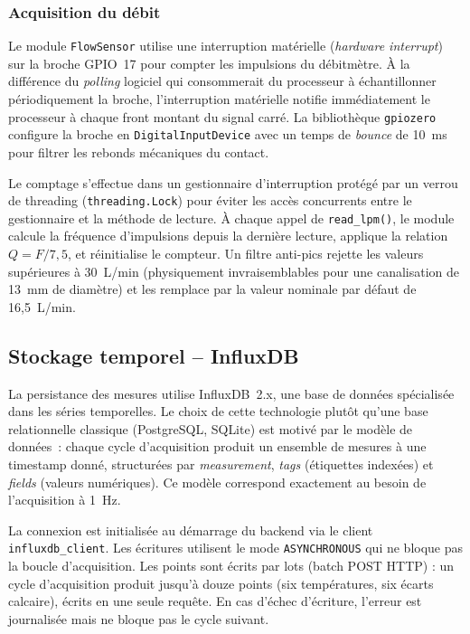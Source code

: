 \subsubsection{Acquisition du débit}

Le module \texttt{FlowSensor} utilise une interruption matérielle (\emph{hardware interrupt}) sur la broche GPIO~17 pour compter les impulsions du débitmètre. À la différence du \emph{polling} logiciel qui consommerait du processeur à échantillonner périodiquement la broche, l'interruption matérielle notifie immédiatement le processeur à chaque front montant du signal carré. La bibliothèque \texttt{gpiozero} configure la broche en \texttt{DigitalInputDevice} avec un temps de \emph{bounce} de 10~ms pour filtrer les rebonds mécaniques du contact.

Le comptage s'effectue dans un gestionnaire d'interruption protégé par un verrou de threading (\texttt{threading.Lock}) pour éviter les accès concurrents entre le gestionnaire et la méthode de lecture. À chaque appel de \texttt{read\_lpm()}, le module calcule la fréquence d'impulsions depuis la dernière lecture, applique la relation \(Q = F / 7,5\), et réinitialise le compteur. Un filtre anti-pics rejette les valeurs supérieures à 30~L/min (physiquement invraisemblables pour une canalisation de 13~mm de diamètre) et les remplace par la valeur nominale par défaut de 16,5~L/min.

\subsection{Stockage temporel -- InfluxDB}

La persistance des mesures utilise InfluxDB~2.x, une base de données spécialisée dans les séries temporelles. Le choix de cette technologie plutôt qu'une base relationnelle classique (PostgreSQL, SQLite) est motivé par le modèle de données~: chaque cycle d'acquisition produit un ensemble de mesures à une timestamp donné, structurées par \emph{measurement}, \emph{tags} (étiquettes indexées) et \emph{fields} (valeurs numériques). Ce modèle correspond exactement au besoin de l'acquisition à 1~Hz.

La connexion est initialisée au démarrage du backend via le client \texttt{influxdb\_client}. Les écritures utilisent le mode \texttt{ASYNCHRONOUS} qui ne bloque pas la boucle d'acquisition. Les points sont écrits par lots (batch POST HTTP) : un cycle d'acquisition produit jusqu'à douze points (six températures, six écarts calcaire), écrits en une seule requête. En cas d'échec d'écriture, l'erreur est journalisée mais ne bloque pas le cycle suivant.

